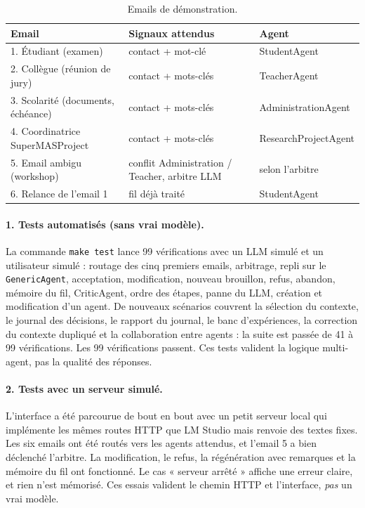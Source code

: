 \documentclass[11pt,a4paper]{article}
\newcommand{\code}[1]{\texttt{#1}}
\begin{document}
\begin{table}[H]
\centering
\small
\begin{tabularx}{\linewidth}{l L l}
\toprule
\textbf{Email} & \textbf{Signaux attendus} & \textbf{Agent} \\
. Étudiant (examen) & contact + mot-clé & StudentAgent \\
2. Collègue (réunion de jury) & contact + mots-clés & TeacherAgent \\
3. Scolarité (documents, échéance) & contact + mots-clés & AdministrationAgent \\
4. Coordinatrice SuperMASProject & contact + mots-clés & ResearchProjectAgent \\
5. Email ambigu (workshop) & conflit Administration / Teacher, arbitre LLM & selon l'arbitre \\
6. Relance de l'email 1 & fil déjà traité & StudentAgent \\
\bottomrule
\end{tabularx}
\caption{Emails de démonstration.}
\end{table}

\paragraph{1. Tests automatisés (sans vrai modèle).}
La commande \code{make test} lance 99 vérifications avec un LLM simulé et un utilisateur
simulé : routage des cinq premiers emails, arbitrage, repli sur le \code{GenericAgent},
acceptation, modification, nouveau brouillon, refus, abandon, mémoire du fil,
CriticAgent, ordre des étapes, panne du LLM, création et modification d'un agent.
De nouveaux scénarios couvrent la sélection du contexte, le journal des décisions, le
rapport du journal, le banc d'expériences, la correction du contexte dupliqué et la
collaboration entre agents : la suite est passée de 41 à 99 vérifications. Les 99
vérifications passent. Ces tests valident la logique multi-agent, pas la qualité
des réponses.

\paragraph{2. Tests avec un serveur simulé.}
L'interface a été parcourue de bout en bout avec un petit serveur local qui implémente
les mêmes routes HTTP que LM Studio mais renvoie des textes fixes. Les six emails ont été
routés vers les agents attendus, et l'email 5 a bien déclenché l'arbitre. La
modification, le refus, la régénération avec remarques et la mémoire du fil ont fonctionné.
Le cas « serveur arrêté » affiche une erreur claire, et rien n'est mémorisé.
Ces essais valident le chemin HTTP et l'interface, \emph{pas} un vrai modèle.
\end{document}
